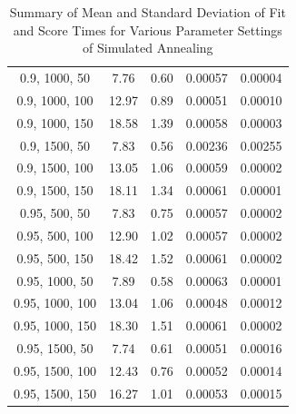 \documentclass[
]{article}
\begin{document}
\begin{table}[H]
{\begin{tabular}{|c|c|c|c|c|}
                0.9, 1000, 50              & 7.76                   & 0.60                  & 0.00057                  & 0.00004                 \\
                0.9, 1000, 100             & 12.97                  & 0.89                  & 0.00051                  & 0.00010                 \\
                0.9, 1000, 150             & 18.58                  & 1.39                  & 0.00058                  & 0.00003                 \\
                0.9, 1500, 50              & 7.83                   & 0.56                  & 0.00236                  & 0.00255                 \\
                0.9, 1500, 100             & 13.05                  & 1.06                  & 0.00059                  & 0.00002                 \\
                0.9, 1500, 150             & 18.11                  & 1.34                  & 0.00061                  & 0.00001                 \\
                0.95, 500, 50              & 7.83                   & 0.75                  & 0.00057                  & 0.00002                 \\
                0.95, 500, 100             & 12.90                  & 1.02                  & 0.00057                  & 0.00002                 \\
                0.95, 500, 150             & 18.42                  & 1.52                  & 0.00061                  & 0.00002                 \\
                0.95, 1000, 50             & 7.89                   & 0.58                  & 0.00063                  & 0.00001                 \\
                0.95, 1000, 100            & 13.04                  & 1.06                  & 0.00048                  & 0.00012                 \\
                0.95, 1000, 150            & 18.30                  & 1.51                  & 0.00061                  & 0.00002                 \\
                0.95, 1500, 50             & 7.74                   & 0.61                  & 0.00051                  & 0.00016                 \\
                0.95, 1500, 100            & 12.43                  & 0.76                  & 0.00052                  & 0.00014                 \\
                0.95, 1500, 150            & 16.27                  & 1.01                  & 0.00053                  & 0.00015                 \\
                \hline
            \end{tabular}
        }
        \caption{Summary of Mean and Standard Deviation of Fit and Score Times for Various Parameter Settings of Simulated Annealing}
        \label{tab:sa_summary_fit_score_times}
    \end{table}
\end{document}
